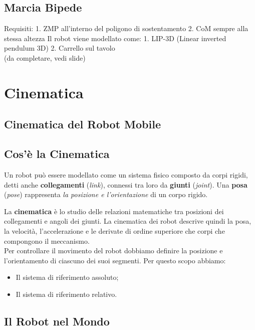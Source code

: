 \documentclass[a4paper,portrait,12pt]{article}
\theoremstyle{definition}
\begin{document}
\subsection{Marcia Bipede}

Requisiti:
1. ZMP all’interno del poligono di sostentamento
2. CoM sempre alla stessa altezza
Il robot viene modellato come:
1. LIP-3D (Linear inverted pendulum 3D)
2. Carrello sul tavolo\\
(da completare, vedi slide)



\section{Cinematica}



\subsection{Cinematica del Robot Mobile}



\subsection{Cos'è la Cinematica}
Un robot può essere modellato come un sistema fisico composto da corpi rigidi, detti anche \textbf{collegamenti} (\emph{link}), connessi tra loro da \textbf{giunti} (\emph{joint}). Una \textbf{posa} (\emph{pose}) rappresenta \emph{la posizione e l'orientazione} di un corpo rigido.

La \textbf{cinematica} è lo studio delle relazioni matematiche tra posizioni dei collegamenti e angoli dei giunti.
La cinematica dei robot descrive quindi la posa, la velocità, l'accelerazione e le derivate di ordine superiore che corpi che compongono il meccanismo.\\

Per controllare il movimento del robot dobbiamo definire la posizione e l'orientamento di ciascuno dei suoi segmenti.
Per questo scopo abbiamo:
\begin{itemize}
\item Il sistema di riferimento assoluto;
\item Il sistema di riferimento relativo.
\end{itemize}

\subsection{Il Robot nel Mondo}
\end{document}
